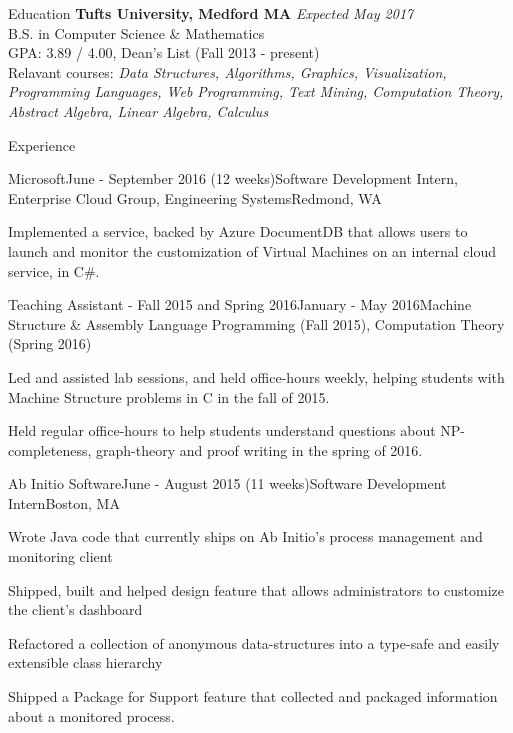 \documentclass{resume}
\begin{document}
  \begin{rSection}{Education}
    {\bf Tufts University, Medford MA} \hfill {\em Expected May 2017} \\ 
    { B.S. in Computer Science \& Mathematics } \\
    GPA: 3.89 / 4.00, Dean's List (Fall 2013 - present)\\
    Relavant courses: 
    \textit{Data Structures, Algorithms, Graphics, Visualization, Programming Languages, Web Programming, Text Mining, Computation Theory, Abstract Algebra, Linear Algebra, Calculus}
  \end{rSection}
  
  \begin{rSection}{Experience}
  
    \begin{rSubsection}{Microsoft}{June - September 2016 (12 weeks)}{Software Development Intern, Enterprise Cloud Group, Engineering Systems}{Redmond, WA}
    \item Implemented a service, backed by Azure DocumentDB that allows users to launch and monitor the customization of Virtual Machines on an internal cloud service, in C\#.
    \end{rSubsection}

    \begin{rSubsection}{Teaching Assistant - Fall 2015 and Spring 2016}{January - May 2016}{Machine Structure \& Assembly Language Programming (Fall 2015), Computation Theory (Spring 2016)}{}
    \item Led and assisted lab sessions, and held office-hours weekly, helping students with Machine Structure problems in C in the fall of 2015.
    \item Held regular office-hours to help students understand questions about NP-completeness, graph-theory and proof writing in the spring of 2016.
    \end{rSubsection}
  
    \begin{rSubsection}{Ab Initio Software}{June - August 2015 (11 weeks)}{Software Development Intern}{Boston, MA}
    \item Wrote Java code that currently ships on Ab Initio's process management and monitoring client
    \item Shipped, built and helped design feature that allows administrators to customize the client’s dashboard
    \item Refactored a collection of anonymous data-structures into a type-safe and easily extensible class hierarchy
    \item Shipped a Package for Support feature that collected and packaged information about a monitored process.
    \end{rSubsection}


\end{rSection}
\end{document}

